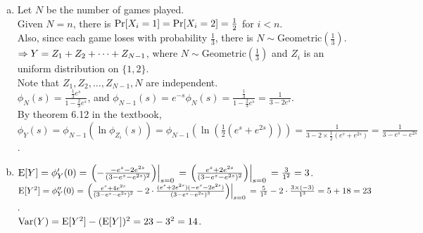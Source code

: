 \begin{pr}$ $
\begin{enumerate}[(a)]
\item Let $N$ be the number of games played.\\
Given $N=n$, there is $\P[X_i=1]=\P[X_i=2]=\frac12$ for $i<n$.\\
Also, since each game loses with probability $\frac13$, there is $N\sim\mathrm{Geometric}(\frac13)$.\\
$\then Y=Z_1+Z_2+\cdots+Z_{N-1}$, where $N\sim\mathrm{Geometric}(\frac13)$ and $Z_i$ is an uniform distribution on $\{1, 2\}$.\\
Note that $Z_1, Z_2, \dots, Z_{N-1}, N$ are independent.\\
$\phi_N(s)=\frac{\frac13e^s}{1-\frac23e^s}$, and $\phi_{N-1}(s)=e^{-s}\phi_N(s)=\frac{\frac13}{1-\frac23e^s}=\frac1{3-2e^s}$.\\
By theorem 6.12 in the textbook, $\phi_Y(s)=\phi_{N-1}(\ln\phi_{Z_i}(s))=\phi_{N-1}(\ln(\frac12(e^s+e^{2s})))=\frac1{3-2\times\frac12(e^s+e^{2s})}=\frac1{3-e^s-e^{2s}}$.
\item $\E[Y]=\phi_Y'(0)\\
=\left.\left(-\frac{-e^s-2e^{2s}}{(3-e^s-e^{2s})^2}\right)\right|_{s=0}\\
=\left.\left(\frac{e^s+2e^{2s}}{(3-e^s-e^{2s})^2}\right)\right|_{s=0}\\
=\frac3{1^2}=3$.\\
$\E[Y^2]=\phi_Y''(0)\\
=\left.\left(\frac{e^s+4e^{2s}}{(3-e^s-e^{2s})^2}-2\cdot\frac{(e^s+2e^{2s})(-e^s-2e^{2s})}{(3-e^s-e^{2s})^3}\right)\right|_{s=0}\\
=\frac5{1^2}-2\cdot\frac{3\times(-3)}{1^3}=5+18=23$.\\
$\Var(Y)=\E[Y^2]-(\E[Y])^2=23-3^2=14$.
\end{enumerate}
\end{pr}
